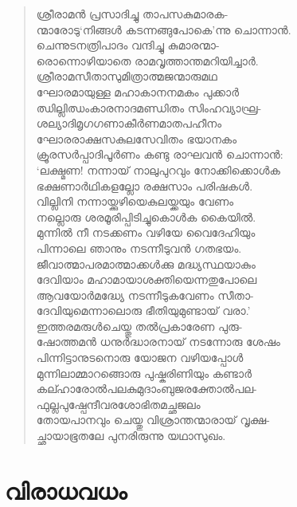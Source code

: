 \begin{verse}
ശ്രീരാമന്‍ പ്രസാദിച്ചു താപസകുമാരക-\\
ന്മാരോടു‘നിങ്ങള്‍ കടന്നങ്ങുപോകെ’ന്നു ചൊന്നാന്‍.\\
ചെന്നുടനത്രിപാദം വന്ദിച്ചു കുമാരന്മാ-\\
രൊന്നൊഴിയാതെ രാമവൃത്താന്തമറിയിച്ചാര്‍.\\
ശ്രീരാമസീതാസുമിത്രാത്മജന്മാരുമഥ\\
ഘോരമായുള്ള മഹാകാനനമകം പുക്കാര്‍\\
ഝില്ലിഝംകാരനാദമണ്ഡിതം സിംഹവ്യാഘ്ര-\\
ശല്യാദിമൃഗഗണാകീര്‍ണമാതപഹീനം\\
ഘോരരാക്ഷസകുലസേവിതം ഭയാനകം\\
ക്രൂരസര്‍പ്പാദിപൂര്‍ണം കണ്ടു രാഘവന്‍ ചൊന്നാന്‍:\\
‘ലക്ഷ്മണ! നന്നായ് നാലുപുറവും നോക്കിക്കൊള്‍ക\\
ഭക്ഷണാര്‍ഥികളല്ലോ രക്ഷസാം പരിഷകള്‍.\\
വില്ലിനി നന്നായ്ക്കുഴിയെകുലയ്ക്കയും വേണം\\
നല്ലൊരു ശരമൂരിപ്പിടിച്ചുകൊള്‍ക കൈയില്‍.\\
മുന്നില്‍ നീ നടക്കണം വഴിയേ വൈദേഹിയും\\
പിന്നാലെ ഞാനും നടന്നീടുവന്‍ ഗതഭയം.\\
ജീവാത്മാപരമാത്മാക്കള്‍ക്കു മദ്ധ്യസ്ഥയാകും\\
ദേവിയാം മഹാമായാശക്തിയെന്നതുപോലെ\\
ആവയോര്‍മദ്ധ്യേ നടന്നീടുകവേണം സീതാ-\\
ദേവിയുമെന്നാലൊരു ഭീതിയുമുണ്ടായ് വരാ.’\\
ഇത്തരമരുള്‍ചെയ്തു തല്‍പ്രകാരേണ പുരു-\\
ഷോത്തമന്‍ ധനുര്‍ദ്ധാരനായ് നടന്നോരു ശേഷം\\
പിന്നിട്ടാനുടനൊരു യോജന വഴിയപ്പോള്‍\\
മുന്നിലാമ്മാറങ്ങൊരു പുഷ്കരിണിയും കണ്ടാര്‍\\
കല്ഹാരോല്‍പലകുമുദാംബുജരക്തോല്‍പല-\\
ഫുല്ലപുഷ്പേന്ദീവരശോഭിതമച്ഛജലം\\
തോയപാനവും ചെയ്തു വിശ്രാന്തന്മാരായ് വൃക്ഷ-\\
ച്ഛായാഭൂതലേ പുനരിരുന്നു യഥാസുഖം.
\end{verse}

\section{വിരാധവധം}

